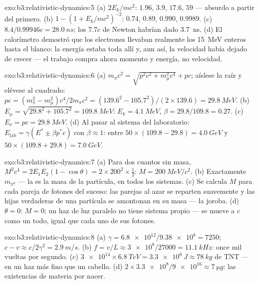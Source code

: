 \begin{solution}{exo:b3:relativistic-dynamics:5}
(a) $2E_k/mc^2$: $1.96$, $3.9$, $17.6$, $59$ --- absurdo a partir del
primero. (b) $1 - (1 + E_k/mc^2)^{-2}$: $0.74$, $0.89$, $0.990$,
$0.9989$. (c) $8.4/0.99946c = \qty{28.0}{ns}$; los $7.7c$ de Newton
habrían dado \qty{3.7}{ns}. (d) El calorímetro demostró que los electrones
llevaban realmente los \qty{15}{MeV} enteros hasta el blanco: la energía
estaba toda allí y, aun así, la velocidad había dejado de crecer --- el
trabajo compra ahora momento y energía, no velocidad.
\end{solution}

\begin{solution}{exo:b3:relativistic-dynamics:6}
(a) $m_\pi c^2 = \sqrt{p^2c^2 + m_\mu^2c^4} + pc$; aíslese la raíz
y elévese al cuadrado: $pc = (m_\pi^2 - m_\mu^2)c^4/2m_\pi c^2 =
(139.6^2 - 105.7^2)/(2 \times 139.6) = \qty{29.8}{MeV}$. (b) $E_\mu =
\sqrt{29.8^2 + 105.7^2} = \qty{109.8}{MeV}$: $E_k = \qty{4.1}{MeV}$,
$\beta = 29.8/109.8 = 0.27$. (c) $E_\nu = pc = \qty{29.8}{MeV}$. (d)
Al pasar al sistema del laboratorio: $E_{\text{lab}} = \gamma(E^* \pm \beta p^*c)$ con $\beta
\approx 1$: entre $50 \times (109.8 - 29.8) = \qty{4.0}{GeV}$ y
$50 \times (109.8 + 29.8) = \qty{7.0}{GeV}$.
\end{solution}

\begin{solution}{exo:b3:relativistic-dynamics:7}
(a) Para dos cuantos sin masa, $M^2c^4 = 2E_1E_2(1 - \cos\theta) =
2 \times 200^2 \times \tfrac12$: $M = \qty{200}{MeV}/c^2$. (b)
Exactamente $m_{\pi^0}$ --- la  es la masa de la partícula,
en todos los sistemas. (c) Se calcula $M$ para cada pareja de fotones del
suceso: las parejas al azar se reparten suavemente y las hijas verdaderas de
una partícula se amontonan en su masa --- la joroba. (d) $\theta = 0$:
$M = 0$; un haz de luz paralelo no tiene sistema propio --- se mueve a $c$
como un todo, igual que cada uno de sus fotones.
\end{solution}

\begin{solution}{exo:b3:relativistic-dynamics:8}
(a) $\gamma = \num{6.8e12}/\num{9.38e8} = 7250$; $c - v \approx
c/2\gamma^2 = \qty{2.9}{m/s}$. (b) $f = v/L \approx \num{3e8}/27000 =
\qty{11.1}{kHz}$: once mil vueltas por segundo. (c) $\num{3e14}
\times \qty{6.8}{TeV} = \qty{3.3e8}{J} \approx \qty{78}{kg}$ de TNT
--- en un haz más fino que un cabello. (d) $2 \times \num{3.3e8}/\num{9e16} \approx
\qty{7}{\micro g}$: las existencias de materia por nacer.
\end{solution}

